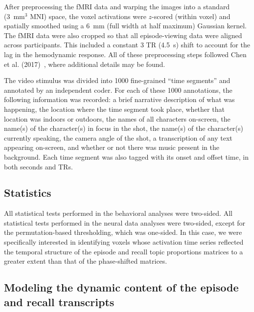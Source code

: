 \documentclass[10pt]{article}
\begin{document}
After preprocessing the fMRI data and warping the images into a standard (3~mm$^3$ MNI) space, the voxel activations were $z$-scored (within voxel) and spatially smoothed using a 6~mm (full width at half maximum) Gaussian kernel.  The fMRI data were also cropped so that all episode-viewing data were aligned across participants.  This included a constant 3 TR (4.5~s) shift to account for the lag in the hemodynamic response.  All of these preprocessing steps followed Chen et al. (2017)~\citep{ChenEtal17}, where additional details may be found.

The video stimulus was divided into 1000 fine-grained ``time segments'' and annotated by an independent coder.  For each of these 1000 annotations, the following information was recorded: a brief narrative description of what was happening, the location where the time segment took place, whether that location was indoors or outdoors, the names of all characters on-screen, the name(s) of the character(s) in focus in the shot, the name(s) of the character(s) currently speaking, the camera angle of the shot, a transcription of any text appearing on-screen, and whether or not there was music present in the background.  Each time segment was also tagged with its onset and offset time, in both seconds and TRs.

\subsection*{Statistics}
All statistical tests performed in the behavioral analyses were two-sided.  All statistical tests performed in the neural data analyses were two-sided, except for the permutation-based thresholding, which was one-sided.  In this case, we were specifically interested in identifying voxels whose activation time series reflected the temporal structure of the episode and recall topic proportions matrices to a greater extent than that of the phase-shifted matrices.

\subsection*{Modeling the dynamic content of the episode and recall transcripts}
\end{document}
